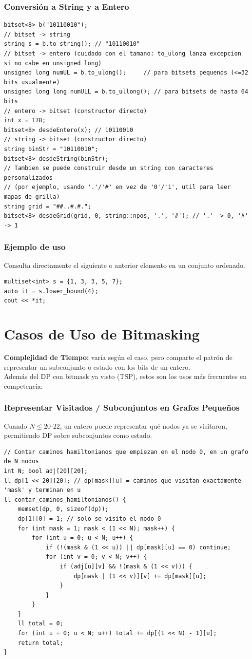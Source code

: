 \documentclass[10pt,twocolumn,letterpaper]{report}
\begin{document}
\subsubsection{Conversión a String y a Entero}
\begin{lstlisting}
bitset<8> b("10110010");
// bitset -> string
string s = b.to_string(); // "10110010"
// bitset -> entero (cuidado con el tamano: to_ulong lanza excepcion si no cabe en unsigned long)
unsigned long numUL = b.to_ulong();     // para bitsets pequenos (<=32 bits usualmente)
unsigned long long numULL = b.to_ullong(); // para bitsets de hasta 64 bits
// entero -> bitset (constructor directo)
int x = 178;
bitset<8> desdeEntero(x); // 10110010
// string -> bitset (constructor directo)
string binStr = "10110010";
bitset<8> desdeString(binStr);
// Tambien se puede construir desde un string con caracteres personalizados
// (por ejemplo, usando '.'/'#' en vez de '0'/'1', util para leer mapas de grilla)
string grid = "##..#.#.";
bitset<8> desdeGrid(grid, 0, string::npos, '.', '#'); // '.' -> 0, '#' -> 1
\end{lstlisting}
\subsubsection*{Ejemplo de uso}
Consulta directamente el siguiente o anterior elemento en un conjunto ordenado.
\begin{lstlisting}
multiset<int> s = {1, 3, 3, 5, 7};
auto it = s.lower_bound(4);
cout << *it;
\end{lstlisting}

\section{Casos de Uso de Bitmasking}
\textbf{Complejidad de Tiempo:} varía según el caso, pero comparte el patrón de representar un subconjunto o estado con los bits de un entero. \\
Además del DP con bitmask ya visto (TSP), estos son los usos más frecuentes en competencia:
\subsubsection{Representar Visitados / Subconjuntos en Grafos Pequeños}
Cuando $N \leq 20$-$22$, un entero puede representar qué nodos ya se visitaron, permitiendo DP sobre subconjuntos como estado.
\begin{lstlisting}
// Contar caminos hamiltonianos que empiezan en el nodo 0, en un grafo de N nodos
int N; bool adj[20][20];
ll dp[1 << 20][20]; // dp[mask][u] = caminos que visitan exactamente 'mask' y terminan en u
ll contar_caminos_hamiltonianos() {
    memset(dp, 0, sizeof(dp));
    dp[1][0] = 1; // solo se visito el nodo 0
    for (int mask = 1; mask < (1 << N); mask++) {
        for (int u = 0; u < N; u++) {
            if (!(mask & (1 << u)) || dp[mask][u] == 0) continue;
            for (int v = 0; v < N; v++) {
                if (adj[u][v] && !(mask & (1 << v))) {
                    dp[mask | (1 << v)][v] += dp[mask][u];
                }
            }
        }
    }
    ll total = 0;
    for (int u = 0; u < N; u++) total += dp[(1 << N) - 1][u];
    return total;
}
\end{lstlisting}
\end{document}
